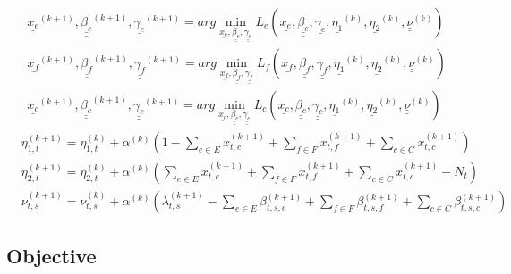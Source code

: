 \documentclass[conference]{IEEEtran}
\begin{document}
    \begin{subequations}
      \begin{align}
        &{\underline {x_e}}^{(k+1)}, \underline{\underline {\beta_e}}^{(k+1)}, \underline{\underline {\gamma_e}}^{(k+1)} = arg \min_{{\underline {x_e}}, \underline{\underline {\beta_e}}, \underline{\underline {\gamma_e}}}L_e({\underline {x_e}}, \underline{\underline {\beta_e}}, \underline{\underline {\gamma_e}}, \underline {\eta_1}^{(k)}, \underline {\eta_2}^{(k)}, \underline{\underline \nu}^{(k)}) \\
        & {\underline {x_f}}^{(k+1)}, \underline{\underline {\beta_f}}^{(k+1)}, \underline{\underline {\gamma_f}}^{(k+1)} = arg \min_{{\underline {x_f}}, \underline{\underline {\beta_f}}, \underline{\underline {\gamma_f}}}L_f({\underline {x_f}}, \underline{\underline {\beta_f}}, \underline{\underline {\gamma_f}}, \underline {\eta_1}^{(k)}, \underline {\eta_2}^{(k)}, \underline{\underline \nu}^{(k)}) \\
        & {\underline {x_c}}^{(k+1)}, \underline{\underline {\beta_c}}^{(k+1)}, \underline{\underline {\gamma_c}}^{(k+1)} = arg \min_{{\underline {x_c}}, \underline{\underline {\beta_c}}, \underline{\underline {\gamma_c}}}L_c({\underline {x_c}}, \underline{\underline {\beta_c}}, \underline{\underline {\gamma_c}}, \underline {\eta_1}^{(k)}, \underline {\eta_2}^{(k)}, \underline{\underline \nu}^{(k)})
      \end{align}
    \end{subequations}
    \begin{subequations}
      \begin{align}
        &\eta_{1,t}^{(k+1)} = \eta_{1,t}^{(k)} + \alpha^{(k)}(1-\sum_{e \in E}x_{t,e}^{(k+1)} + \sum_{f \in F}x_{t,f}^{(k+1)} + \sum_{c \in C}x_{t,c}^{(k+1)}) \\
        &\eta_{2,t}^{(k+1)} = \eta_{2,t}^{(k)} + \alpha^{(k)}(\sum_{e \in E}x_{t,e}^{(k+1)} + \sum_{f \in F}x_{t,f}^{(k+1)} + \sum_{c \in C}x_{t,c}^{(k+1)}-N_t) \\
        &\nu_{t,s}^{(k+1)} = \nu_{t,s}^{(k)} + \alpha^{(k)}(\lambda_{t,s}^{(k+1)} - \sum_{e \in E}\beta_{t,s,e}^{(k+1)} + \sum_{f \in F}\beta_{t,s,f}^{(k+1)} +\sum_{c \in C}\beta_{t,s,c}^{(k+1)})
      \end{align}
    \end{subequations}
    \subsection{Objective}
\end{document}
